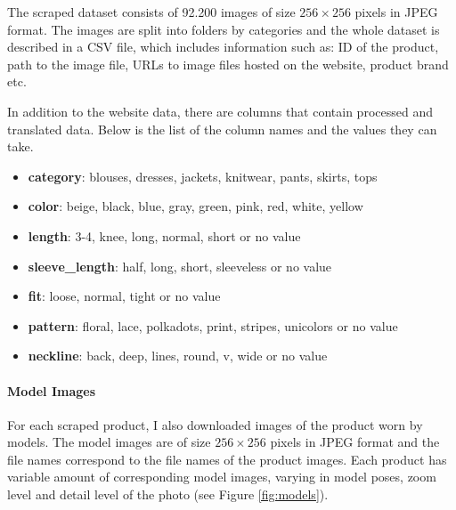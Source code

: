 \documentclass[12pt]{report}
\begin{document}
The scraped dataset consists of 92.200 images of size $256\times256$ pixels in JPEG format. The images are split into folders by categories and the whole dataset is described in a CSV file, which includes information such as: ID of the product,  path to the image file, URLs to image files hosted on the website, product brand etc.

In addition to the website data, there are columns that contain processed and translated data. Below is the list of the column names and the values they can take.
\begin{itemize}
\item \textbf{category}: blouses, dresses, jackets, knitwear, pants, skirts, tops
\item \textbf{color}: beige, black, blue, gray, green, pink, red, white, yellow
\item \textbf{length}: 3-4, knee, long, normal, short or no value
\item \textbf{sleeve\_length}: half, long, short, sleeveless or no value
\item \textbf{fit}: loose, normal, tight or no value
\item \textbf{pattern}: floral, lace, polkadots, print, stripes, unicolors or no value
\item \textbf{neckline}: back, deep, lines, round, v, wide or no value
\end{itemize}

\pagebreak
\paragraph{Model Images}
For each scraped product, I also downloaded images of the product worn by models. The model images are of size $256\times256$ pixels in JPEG format and the file names correspond to the file names of the product images. Each product has variable amount of corresponding model images, varying in model poses, zoom level and detail level of the photo (see Figure \ref{fig:models}).
\end{document}
